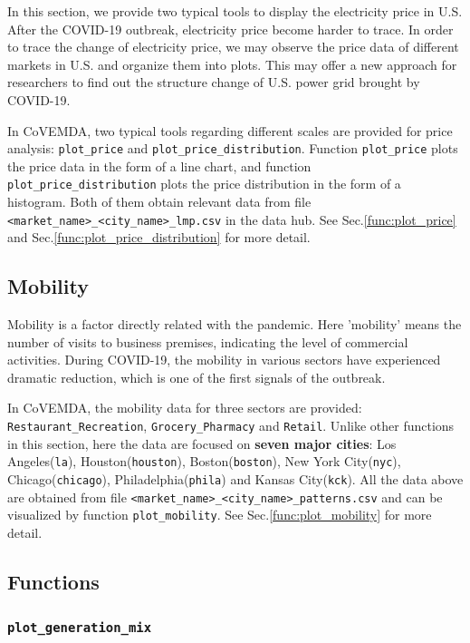 \documentclass[10pt]{article}
\newcommand{\covemda}{CoVEMDA}
\numberwithin{equation}{section}
\numberwithin{table}{section}
\numberwithin{figure}{section}
\begin{document}
In this section, we provide two typical tools to display the electricity price in U.S. After the COVID-19 outbreak, electricity price become harder to trace. In order to trace the change of electricity price, we may observe the price data of different markets in U.S. and organize them into plots. This may offer a new approach for researchers to find out the structure change of U.S. power grid brought by COVID-19.

In \covemda{}, two typical tools regarding different scales are provided for price analysis: \verb!plot_price! and \verb!plot_price_distribution!. Function \verb!plot_price! plots the price data in the form of a line chart, and function \verb!plot_price_distribution! plots the price distribution in the form of a histogram. Both of them obtain relevant data from file \\\verb!<market_name>_<city_name>_lmp.csv! in the data hub. See Sec.\ref{func:plot_price} and Sec.\ref{func:plot_price_distribution} for more detail.



\subsection{Mobility}

Mobility is a factor directly related with the pandemic. Here 'mobility' means the number of visits to business premises, indicating the level of commercial activities. During COVID-19, the mobility in various sectors have experienced dramatic reduction, which is one of the first signals of the outbreak.

In \covemda{}, the mobility data for three sectors are provided: \verb!Restaurant_Recreation!, \verb!Grocery_Pharmacy! and \verb!Retail!. Unlike other functions in this section, here the data are focused on \textbf{seven major cities}: Los Angeles(\verb!la!), Houston(\verb!houston!), Boston(\verb!boston!), New York City(\verb!nyc!), Chicago(\verb!chicago!), Philadelphia(\verb!phila!) and Kansas City(\verb!kck!). All the data above are obtained from file \verb!<market_name>_<city_name>_patterns.csv! and can be visualized by function \verb!plot_mobility!. See Sec.\ref{func:plot_mobility} for more detail.



\subsection{Functions}

\subsubsection{\texttt{plot\_generation\_mix}}\label{func:plot_generation_mix}
\end{document}
